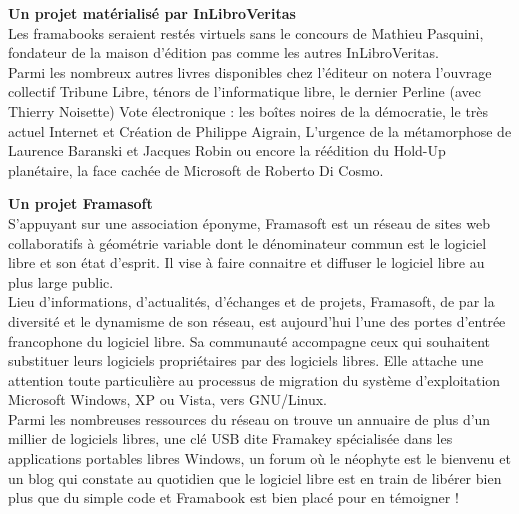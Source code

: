 {\textbf{Un projet matérialisé par InLibroVeritas}\\
Les framabooks seraient restés virtuels sans le concours de Mathieu Pasquini, fondateur de la maison d'édition pas comme les autres InLibroVeritas.\\
Parmi les nombreux autres livres disponibles chez l'éditeur on notera l'ouvrage collectif Tribune Libre, ténors de l'informatique libre, le dernier Perline (avec Thierry Noisette) Vote électronique : les boîtes noires de la démocratie, le très actuel Internet et Création de Philippe Aigrain, L'urgence de la métamorphose de Laurence Baranski et Jacques Robin ou encore la réédition du Hold-Up planétaire, la face cachée de Microsoft de Roberto Di Cosmo.\par
\textbf{Un projet Framasoft}\\
S'appuyant sur une association éponyme, Framasoft est un réseau de sites web collaboratifs à géométrie variable dont le dénominateur commun est le logiciel libre et son état d'esprit. Il vise à faire connaitre et diffuser le logiciel libre au plus large public.\\
Lieu d'informations, d'actualités, d'échanges et de projets, Framasoft, de par la diversité et le dynamisme de son réseau, est aujourd'hui l'une des portes d'entrée francophone du logiciel libre. Sa communauté accompagne ceux qui souhaitent substituer leurs logiciels propriétaires par des logiciels libres. Elle attache une attention toute particulière au processus de migration du système d'exploitation Microsoft Windows, XP ou Vista, vers GNU/Linux.\\
Parmi les nombreuses ressources du réseau on trouve un annuaire de plus d'un millier de logiciels libres, une clé USB dite Framakey spécialisée dans les applications portables libres Windows, un forum où le néophyte est le bienvenu et un blog qui constate au quotidien que le logiciel libre est en train de libérer bien plus que du simple code et Framabook est bien placé pour en témoigner !
}
